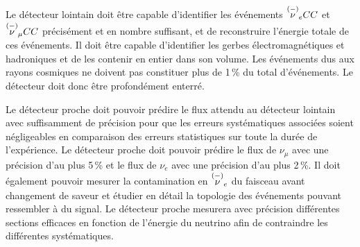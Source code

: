         Le détecteur lointain doit être capable d'identifier les événements $\overset{(-)}{\nu}_e CC$ et $\overset{(-)}{\nu}_{\mu} CC$ précisément et en nombre suffisant, et de reconstruire l'énergie totale de ces événements. Il doit être capable d'identifier les gerbes électromagnétiques et hadroniques et de les contenir en entier dans son volume. Les événements dus aux rayons cosmiques ne doivent pas constituer plus de 1\,\% du total d'événements. Le détecteur doit donc être profondément enterré.

        Le détecteur proche doit pouvoir prédire le flux attendu au détecteur lointain avec suffisamment de précision pour que les erreurs systématiques associées soient négligeables en comparaison des erreurs statistiques sur toute la durée de l'expérience. Le détecteur proche doit pouvoir prédire le flux de $\nu_{\mu}$ avec une précision d'au plus 5\,\% et le flux de $\nu_e$ avec une précision d'au plus 2\,\%. Il doit également pouvoir mesurer la contamination en $\overset{(-)}{\nu}_e$ du faisceau avant changement de saveur et étudier en détail la topologie des événements pouvant ressembler à du signal. Le détecteur proche mesurera avec précision différentes sections efficaces en fonction de l'énergie du neutrino afin de contraindre les différentes systématiques.
        
